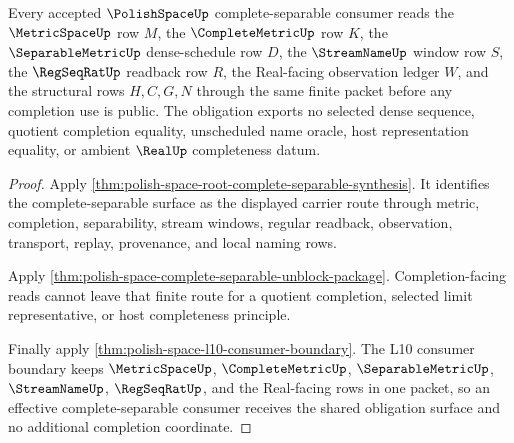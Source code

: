 \begin{theorem}
\label{thm:polishspace-effective-complete-separable-obligation}
Every accepted $\PolishSpaceUp$ complete-separable consumer reads the $\MetricSpaceUp$ row $M$, the $\CompleteMetricUp$ row $K$, the $\SeparableMetricUp$ dense-schedule row $D$, the $\StreamNameUp$ window row $S$, the $\RegSeqRatUp$ readback row $R$, the Real-facing observation ledger $W$, and the structural rows $H,C,G,N$ through the same finite packet before any completion use is public. The obligation exports no selected dense sequence, quotient completion equality, unscheduled name oracle, host representation equality, or ambient $\RealUp$ completeness datum.
\end{theorem}
\begin{proof}
Apply \autoref{thm:polish-space-root-complete-separable-synthesis}. It identifies the complete-separable surface as the displayed carrier route through metric, completion, separability, stream windows, regular readback, observation, transport, replay, provenance, and local naming rows.

Apply \autoref{thm:polish-space-complete-separable-unblock-package}. Completion-facing reads cannot leave that finite route for a quotient completion, selected limit representative, or host completeness principle.

Finally apply \autoref{thm:polish-space-l10-consumer-boundary}. The L10 consumer boundary keeps $\MetricSpaceUp$, $\CompleteMetricUp$, $\SeparableMetricUp$, $\StreamNameUp$, $\RegSeqRatUp$, and the Real-facing rows in one packet, so an effective complete-separable consumer receives the shared obligation surface and no additional completion coordinate.
\end{proof}
